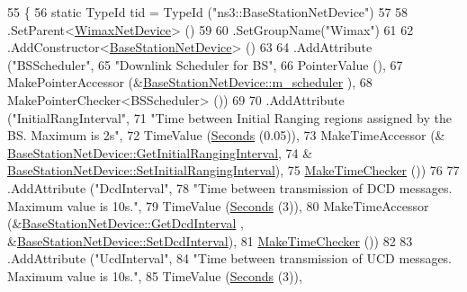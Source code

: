 \begin{DoxyCode}
55 \{
56   \textcolor{keyword}{static} TypeId tid = TypeId (\textcolor{stringliteral}{"ns3::BaseStationNetDevice"})
57 
58     .SetParent<\hyperlink{classns3_1_1WimaxNetDevice_ad70bee64c458c43a6f374629dbf85f66}{WimaxNetDevice}> ()
59 
60     .SetGroupName(\textcolor{stringliteral}{"Wimax"})
61 
62     .AddConstructor<\hyperlink{classns3_1_1BaseStationNetDevice_a407f0e1a3bde6e56b31cfafef15cd2ac}{BaseStationNetDevice}> ()
63 
64     .AddAttribute (\textcolor{stringliteral}{"BSScheduler"},
65                    \textcolor{stringliteral}{"Downlink Scheduler for BS"},
66                    PointerValue (),
67                    MakePointerAccessor (&\hyperlink{classns3_1_1BaseStationNetDevice_ae25a05b8fbaed29fd59277f928683a16}{BaseStationNetDevice::m\_scheduler}
      ),
68                    MakePointerChecker<BSScheduler> ())
69 
70     .AddAttribute (\textcolor{stringliteral}{"InitialRangInterval"},
71                    \textcolor{stringliteral}{"Time between Initial Ranging regions assigned by the BS. Maximum is 2s"},
72                    TimeValue (\hyperlink{group__timecivil_ga33c34b816f8ff6628e33d5c8e9713b9e}{Seconds} (0.05)),
73                    MakeTimeAccessor (&
      \hyperlink{classns3_1_1BaseStationNetDevice_a8486dcfd2a7acf13596532d01a155f2c}{BaseStationNetDevice::GetInitialRangingInterval},
74                                      &
      \hyperlink{classns3_1_1BaseStationNetDevice_a82cfe5c55fc8ba6cea038075e0b6d845}{BaseStationNetDevice::SetInitialRangingInterval}),
75                    \hyperlink{group__time_ga7032965bd4afa578691d88c09e4481c1}{MakeTimeChecker} ())
76 
77     .AddAttribute (\textcolor{stringliteral}{"DcdInterval"},
78                    \textcolor{stringliteral}{"Time between transmission of DCD messages. Maximum value is 10s."},
79                    TimeValue (\hyperlink{group__timecivil_ga33c34b816f8ff6628e33d5c8e9713b9e}{Seconds} (3)),
80                    MakeTimeAccessor (&\hyperlink{classns3_1_1BaseStationNetDevice_aae555330aa8c0b5398b247168419912b}{BaseStationNetDevice::GetDcdInterval}
      , &\hyperlink{classns3_1_1BaseStationNetDevice_a092f0cbfa19478d241d3bb69926400ff}{BaseStationNetDevice::SetDcdInterval}),
81                    \hyperlink{group__time_ga7032965bd4afa578691d88c09e4481c1}{MakeTimeChecker} ())
82 
83     .AddAttribute (\textcolor{stringliteral}{"UcdInterval"},
84                    \textcolor{stringliteral}{"Time between transmission of UCD messages. Maximum value is 10s."},
85                    TimeValue (\hyperlink{group__timecivil_ga33c34b816f8ff6628e33d5c8e9713b9e}{Seconds} (3)),

\end{DoxyCode}
